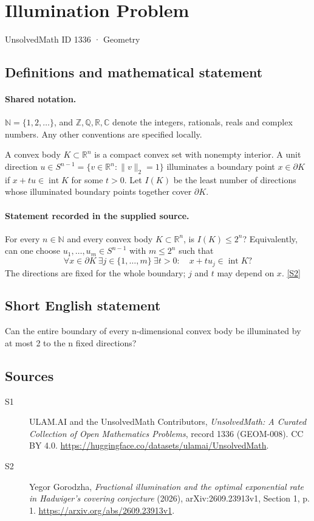 \documentclass[11pt]{article}
\newcommand{\sref}[2]{\hyperlink{source:#1:#2}{[S#2]}}
\begin{document}
\setcounter{section}{1335}
\section{Illumination Problem}\label{1336}
{\small\sffamily UnsolvedMath ID 1336 · Geometry}
\subsection{Definitions and mathematical statement}

\paragraph{Shared notation.}$\mathbb N=\{1,2,\ldots\}$, and $\mathbb Z,\mathbb Q,\mathbb R,\mathbb C$ denote the integers, rationals, reals and complex numbers. Any other conventions are specified locally.


A convex body $K\subset\mathbb R^n$ is a compact convex set with nonempty interior. A unit direction $u\in S^{n-1}=\{v\in\mathbb R^n:\|v\|_2=1\}$ illuminates a boundary point $x\in\partial K$ if $x+tu\in\operatorname{int}K$ for some $t>0$. Let $I(K)$ be the least number of directions whose illuminated boundary points together cover $\partial K$.
\paragraph{Statement recorded in the supplied source.}
For every $n\in\mathbb N$ and every convex body $K\subset\mathbb R^n$, is $I(K)\le 2^n$? Equivalently, can one choose $u_1,\ldots,u_m\in S^{n-1}$ with $m\le2^n$ such that
\[
 \forall x\in\partial K\ \exists j\in\{1,\ldots,m\}\ \exists t>0:\quad x+tu_j\in\operatorname{int}K?
\]
The directions are fixed for the whole boundary; $j$ and $t$ may depend on $x$. \sref{1336}{2}
\subsection{Short English statement}
Can the entire boundary of every n-dimensional convex body be illuminated by at most 2 to the n fixed directions?
\subsection{Sources}
\begin{description}
\item[\hypertarget{source:1336:1}{S1}] ULAM.AI and the UnsolvedMath Contributors, \emph{UnsolvedMath: A Curated Collection of Open Mathematics Problems}, record 1336 (GEOM-008). CC BY 4.0. \url{https://huggingface.co/datasets/ulamai/UnsolvedMath}.
\item[\hypertarget{source:1336:2}{S2}] Yegor Gorodzha, \emph{Fractional illumination and the optimal exponential rate in Hadwiger's covering conjecture} (2026), arXiv:2609.23913v1, Section 1, p. 1. \url{https://arxiv.org/abs/2609.23913v1}.
\end{description}
\label{end:1336}
\end{document}
